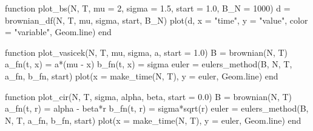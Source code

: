 \documentclass[a4paper,12pt]{article}
\begin{document}
\begin{juliacode}
function plot_bs(N, T, mu = 2, sigma = 1.5, start = 1.0, B_N = 1000)
    d = brownian_df(N, T, mu, sigma, start, B_N)
    plot(d, x = "time", y = "value", color = "variable", Geom.line)
end

function plot_vasicek(N, T, mu, sigma, a, start = 1.0)
    B = brownian(N, T)
    a_fn(t, x) = a*(mu - x)
    b_fn(t, x) = sigma
    euler = eulers_method(B, N, T, a_fn, b_fn, start)
    plot(x = make_time(N, T), y = euler, Geom.line)
end

function plot_cir(N, T, sigma, alpha, beta, start = 0.0)
    B = brownian(N, T)
    a_fn(t, r) = alpha - beta*r
    b_fn(t, r) = sigma*sqrt(r)
    euler = eulers_method(B, N, T, a_fn, b_fn, start)
    plot(x = make_time(N, T), y = euler, Geom.line)
end
\end{juliacode}
\end{document}
